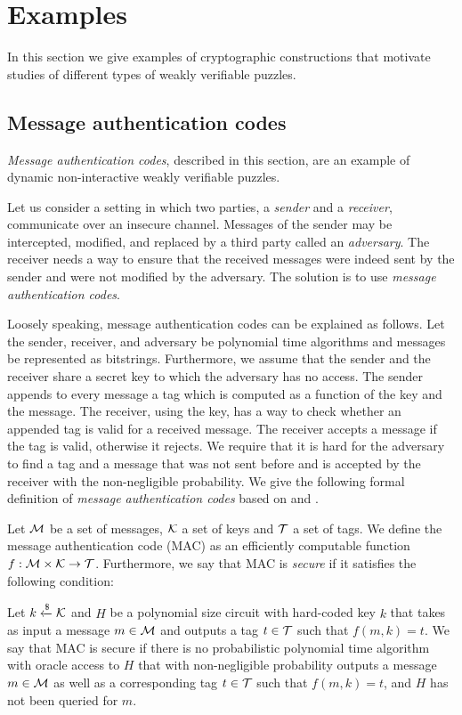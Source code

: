 \section{Examples}
\label{section:wvp_examples}
In this section we give examples of cryptographic constructions that motivate studies of different types of weakly verifiable puzzles.

\subsection{Message authentication codes}
\textit{Message authentication codes}, described in this section, are an example of dynamic non-interactive weakly verifiable puzzles.

Let us consider a setting in which two parties, a \textit{sender} and a \textit{receiver}, communicate over an insecure channel.
Messages of the sender may be intercepted, modified, and replaced by a third party called an \textit{adversary}.
The receiver needs a way to ensure that the received messages were indeed sent by the sender and were not modified by the adversary.
The solution is to use \textit{message authentication codes}.

Loosely speaking, message authentication codes can be explained as follows.
Let the sender, receiver, and adversary be polynomial time algorithms and messages be represented as bitstrings.
Furthermore, we assume that the sender and the receiver share a secret key to which the adversary has no access.
The sender appends to every message a tag which is computed as a function of the key and the message.
The receiver, using the key, has a way to check whether an appended tag is valid for a received message.
The receiver accepts a message if the tag is valid, otherwise it rejects.
We require that it is hard for the adversary to find a tag and a message that was not sent before and is
accepted by the receiver with the non-negligible probability. We give the following formal definition
of \textit{message authentication codes} based on \cite{LectureNotesCrypo} and \cite{Goldreich:2004:FCV:975541}.
\begin{definition}
  \label{def:mac}
  Let $\mathcal{M}$ be a set of messages, $\mathcal{K}$ a set of keys and $\mathcal{T}$ a set of tags.
  We define the \textnormal{message authentication code (MAC)} as an efficiently computable function $f:\mathcal{M} \times \mathcal{K} \rightarrow \mathcal{T}$.
  Furthermore, we say that MAC is \textit{secure} if it satisfies the following condition:

  Let $k \xleftarrow{\$} \mathcal{K}$ and $H$ be a polynomial size circuit with hard-coded key $k$ that takes as input a message $m \in \mathcal{M}$ and outputs a tag $t \in \mathcal{T}$
  such that $f(m,k) = t$. We say that MAC is secure if there is no probabilistic polynomial time algorithm
  with oracle access to $H$ that with non-negligible probability outputs a message $m \in \mathcal{M}$
  as well as a corresponding tag $t \in \mathcal{T}$ such that $f(m, k) = t$, and $H$ has not been queried for $m$.
\end{definition}

